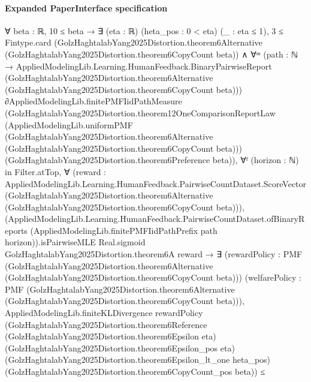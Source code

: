 \documentclass[10pt]{article}
\begin{document}
\paragraph{Expanded PaperInterface specification}
\begin{ReviewVerbatim}
∀ {beta : ℝ},
  10 ≤ beta →
    ∃ (eta : ℝ) (heta_pos : 0 < eta) (_ : eta ≤ 1),
      3 ≤
          Fintype.card
            (GolzHaghtalabYang2025Distortion.theorem6Alternative
              (GolzHaghtalabYang2025Distortion.theorem6CopyCount beta)) ∧
        ∀ᵐ (path :
          ℕ →
            AppliedModelingLib.Learning.HumanFeedback.BinaryPairwiseReport
              (GolzHaghtalabYang2025Distortion.theorem6Alternative
                (GolzHaghtalabYang2025Distortion.theorem6CopyCount
                  beta))) ∂AppliedModelingLib.finitePMFIidPathMeasure
            (GolzHaghtalabYang2025Distortion.theorem12OneComparisonReportLaw
              (AppliedModelingLib.uniformPMF
                (GolzHaghtalabYang2025Distortion.theorem6Alternative
                  (GolzHaghtalabYang2025Distortion.theorem6CopyCount beta)))
              (GolzHaghtalabYang2025Distortion.theorem6Preference beta)),
          ∀ᶠ (horizon : ℕ) in Filter.atTop,
            ∀
              (reward :
                AppliedModelingLib.Learning.HumanFeedback.PairwiseCountDataset.ScoreVector
                  (GolzHaghtalabYang2025Distortion.theorem6Alternative
                    (GolzHaghtalabYang2025Distortion.theorem6CopyCount beta))),
              (AppliedModelingLib.Learning.HumanFeedback.PairwiseCountDataset.ofBinaryReports
                      (AppliedModelingLib.finitePMFIidPathPrefix path horizon)).isPairwiseMLE
                  Real.sigmoid GolzHaghtalabYang2025Distortion.theorem6A reward →
                ∃ (rewardPolicy :
                  PMF
                    (GolzHaghtalabYang2025Distortion.theorem6Alternative
                      (GolzHaghtalabYang2025Distortion.theorem6CopyCount beta)))
                  (welfarePolicy :
                  PMF
                    (GolzHaghtalabYang2025Distortion.theorem6Alternative
                      (GolzHaghtalabYang2025Distortion.theorem6CopyCount beta))),
                  AppliedModelingLib.finiteKLDivergence rewardPolicy
                        (GolzHaghtalabYang2025Distortion.theorem6Reference
                          (GolzHaghtalabYang2025Distortion.theorem6Epsilon eta)
                          (GolzHaghtalabYang2025Distortion.theorem6Epsilon_pos eta)
                          (GolzHaghtalabYang2025Distortion.theorem6Epsilon_lt_one heta_pos)
                          (GolzHaghtalabYang2025Distortion.theorem6CopyCount_pos beta)) ≤

\end{ReviewVerbatim}
\end{document}
